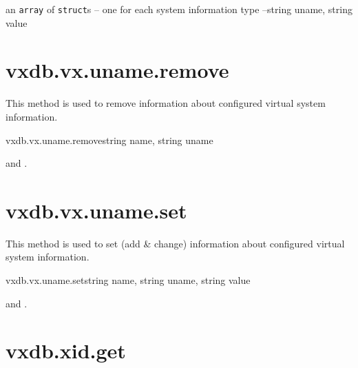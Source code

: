 \begin{rpcreturncomplex}{an \texttt{array} of \texttt{struct}s -- one for each
	system information type --}{string uname, string value}
\end{rpcreturncomplex}

\rpcnoerrors


\section{vxdb.vx.uname.remove}

This method is used to remove information about configured virtual system
information.

\begin{rpcsynopsis}{vxdb.vx.uname.remove}{string name, string uname}
\end{rpcsynopsis}

\begin{rpcaccess}
 and \rpcownerchecks.
\end{rpcaccess}

\rpcreturnnil

\rpcnoerrors


\section{vxdb.vx.uname.set}

This method is used to set (add \& change) information about configured virtual
system information.

\begin{rpcsynopsis}{vxdb.vx.uname.set}{string name, string uname, string value}
\end{rpcsynopsis}

\begin{rpcaccess}
 and \rpcownerchecks.
\end{rpcaccess}

\rpcreturnnil

\rpcnoerrors


\section{vxdb.xid.get}

